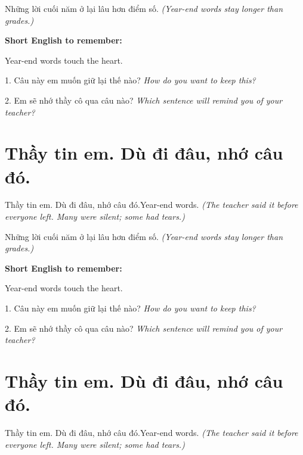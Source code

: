 \begin{baihoc}
Những lời cuối năm ở lại lâu hơn điểm số.
\textit{(Year-end words stay longer than grades.)}
\end{baihoc}

\begin{ghinhoanh}
\textbf{Short English to remember:}

Year-end words touch the heart.

\end{ghinhoanh}

\begin{tuhocnhanh}
1. Câu này em muốn giữ lại thế nào? \textit{How do you want to keep this?}

2. Em sẽ nhớ thầy cô qua câu nào? \textit{Which sentence will remind you of your teacher?}
\end{tuhocnhanh}
\ngancach


\section{Thầy tin em. Dù đi đâu, nhớ câu đó.}
\begin{truyen}{Thầy tin em. Dù đi đâu, nhớ câu đó.}{Year-end words.}
\textit{(The teacher said it before everyone left. Many were silent; some had tears.)}
\end{truyen}

\begin{baihoc}
Những lời cuối năm ở lại lâu hơn điểm số.
\textit{(Year-end words stay longer than grades.)}
\end{baihoc}

\begin{ghinhoanh}
\textbf{Short English to remember:}

Year-end words touch the heart.

\end{ghinhoanh}

\begin{tuhocnhanh}
1. Câu này em muốn giữ lại thế nào? \textit{How do you want to keep this?}

2. Em sẽ nhớ thầy cô qua câu nào? \textit{Which sentence will remind you of your teacher?}
\end{tuhocnhanh}
\ngancach


\section{Thầy tin em. Dù đi đâu, nhớ câu đó.}
\begin{truyen}{Thầy tin em. Dù đi đâu, nhớ câu đó.}{Year-end words.}
\textit{(The teacher said it before everyone left. Many were silent; some had tears.)}
\end{truyen}


